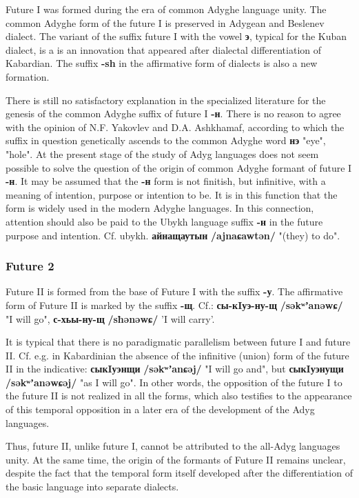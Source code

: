 \documentclass[a4paper,12pt]{book}
\newcommand{\1}[1]{\textbf{\emph{#1}}} %
\newcommand{\2}[1]{\textbf{[#1]}} %
\newcommand{\3}[1]{\fontsize{11pt}{0cm}\textbf{\emph{#1}}} %
\newcommand{\4}[1]{\fontsize{10pt}{0cm}\emph{#1}}	%
\newcommand{\5}[1]{\textbf{/#1/}} %
\newcommand{\6}[1]{\textbf{[#1]}} %
\newcommand{\7}[1]{\fontsize{12pt}{0cm}\emph{#1}} %
\newcommand{\8}[1]{\fontsize{12pt}{0cm}`#1'} %
\newcommand{\9}[1]{\fontsize{12pt}{0cm}(lit. `#1')} %
\newcommand{\glossphonemics}[1]{\textbf{/#1/}} %
\begin{document}
Future I was formed during the era of common Adyghe language unity. The common Adyghe form of the future I is preserved in Adygean and Beslenev dialect. The variant of the suffix future I with the vowel \textbf{э}, typical for the Kuban dialect, is a is an innovation that appeared after dialectal differentiation of Kabardian. The suffix \textbf{-sh} in the affirmative form of dialects is also a new formation.

There is still no satisfactory explanation in the specialized literature for the genesis of the common Adyghe suffix of future I \textbf{-н}. There is no reason to agree with the opinion of N.F. Yakovlev and D.A. Ashkhamaf, according to which the suffix in question genetically ascends to the common Adyghe word \textbf{нэ} "eye", "hole". At the present stage of the study of Adyg languages does not seem possible to solve the question of the origin of common Adyghe formant of future I \textbf{-н}. It may be assumed that the \textbf{-н} form is not finitish, but infinitive, with a meaning of intention, purpose or intention to be. It is in this function that the form is widely used in the modern Adyghe languages. In this connection, attention should also be paid to the Ubykh language suffix \textbf{-н} in the future purpose and intention. Cf. ubykh. \textbf{айнащаутын} \glossphonemics{ajnaɕawtən} "(they) to do".
\subsubsection{Future 2}
Future II is formed from the base of Future I with the suffix \textbf{-у}. The affirmative form of Future II is marked by the suffix \textbf{-щ}. Cf.: \textbf{сы-кIуэ-ну-щ} \glossphonemics{səkʷʼanəwɕ} "I will go", \textbf{с-хьы-ну-щ} \glossphonemics{sħənəwɕ} 'I will carry'.

It is typical that there is no paradigmatic parallelism between future I and future II. Cf. e.g. in Kabardinian the absence of the infinitive (union) form of the future II in the indicative: \textbf{сыкIуэнщи} \glossphonemics{səkʷʼanɕəj} "I will go and", but \textbf{сыкIуэнущи} \glossphonemics{səkʷʼanəwɕəj} "as I will go". In other words, the opposition of the future I to the future II is not realized in all the forms, which also testifies to the appearance of this temporal opposition in a later era of the development of the Adyg languages.

Thus, future II, unlike future I, cannot be attributed to the all-Adyg languages unity. At the same time, the origin of the formants of Future II remains unclear, despite the fact that the temporal form itself developed after the differentiation of the basic language into separate dialects.
\end{document}
